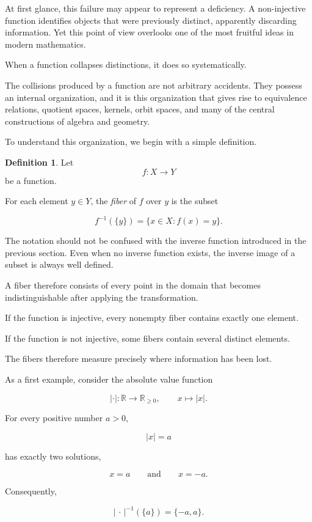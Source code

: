 \documentclass[11pt]{book}
\numberwithin{equation}{chapter}
\theoremstyle{definition}
\newtheorem{definition}{Definition}[chapter]
\theoremstyle{plain}
\theoremstyle{remark}
\begin{document}
At first glance, this failure may appear to represent a deficiency. A non-injective function identifies objects that were previously distinct, apparently discarding information. Yet this point of view overlooks one of the most fruitful ideas in modern mathematics.

When a function collapses distinctions, it does so systematically.

The collisions produced by a function are not arbitrary accidents. They possess an internal organization, and it is this organization that gives rise to equivalence relations, quotient spaces, kernels, orbit spaces, and many of the central constructions of algebra and geometry.

To understand this organization, we begin with a simple definition.

\begin{definition}
Let
\[
f:X\rightarrow Y
\]
be a function.

For each element \(y\in Y\), the \emph{fiber} of \(f\) over \(y\) is the subset

\[
f^{-1}(\{y\})
=
\{x\in X:f(x)=y\}.
\]
\end{definition}

The notation should not be confused with the inverse function introduced in the previous section. Even when no inverse function exists, the inverse image of a subset is always well defined.

A fiber therefore consists of every point in the domain that becomes indistinguishable after applying the transformation.

If the function is injective, every nonempty fiber contains exactly one element.

If the function is not injective, some fibers contain several distinct elements.

The fibers therefore measure precisely where information has been lost.

As a first example, consider the absolute value function

\[
|\cdot|:\mathbb{R}\rightarrow\mathbb{R}_{\ge0},
\qquad
x\mapsto |x|.
\]

For every positive number \(a>0\),

\[
|x|=a
\]

has exactly two solutions,

\[
x=a
\qquad\text{and}\qquad
x=-a.
\]

Consequently,

\[
|\,\cdot\,|^{-1}(\{a\})
=
\{-a,a\}.
\]
\end{document}
